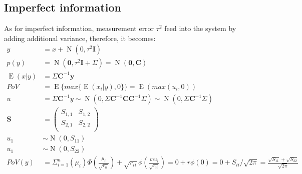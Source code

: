 \documentclass[11pt,a4paper]{article}
\begin{document}
\subsection{Imperfect information}
As for imperfect information, measurement error $\tau^2$ feed into the system by adding additional variance, therefore, it becomes:
\begin{equation}
	\begin{split}
		y &= x + \mathop{N}(0, \tau^2 \bm{I})\\
		p(y) &= \mathop{N}(\bm{0}, \tau^2\bm{I} + \Sigma) = \mathop{N}(\bm{0}, \bm{C})\\
		\mathop{E}(x|y)&=\Sigma\bm{C}^{-1}\bm{y}\\
		PoV &= \mathop{E}\{max\{\mathop{E}(x_i|y), 0\}\}=\mathop{E}(max(u_i, 0))\\
		u &= \Sigma\bm{C}^{-1}y\sim\mathop{N}(0, \Sigma\bm{C}^{-1}\bm{C}\bm{C}^{-1}\Sigma)\sim\mathop{N}(0, \Sigma\bm{C}^{-1}\Sigma)\\
		\bm{S}&= 
		\begin{pmatrix}
		S_{1, 1} & S_{1, 2}\\
		S_{2, 1} & S_{2, 2}\\
		\end{pmatrix}\\
		u_1&\sim\mathop{N}(0, S_{11})\\
		u_1&\sim\mathop{N}(0, S_{22})\\
		PoV(y) &= \Sigma_{i = 1}^{n}(\mu_i)\Phi(\frac{\mu_i}{\sqrt{r_{ii}}}) + \sqrt{r_{ii}}\phi(\frac{mu_i}{\sqrt{r_{ii}}}) = 0 + r\phi(0) = 0 + S_{ii}/\sqrt{2\pi} = \frac{\sqrt{S_{11}}+ \sqrt{S_{22}}}{\sqrt{2\pi}}
	\end{split}
\end{equation}
\end{document}
